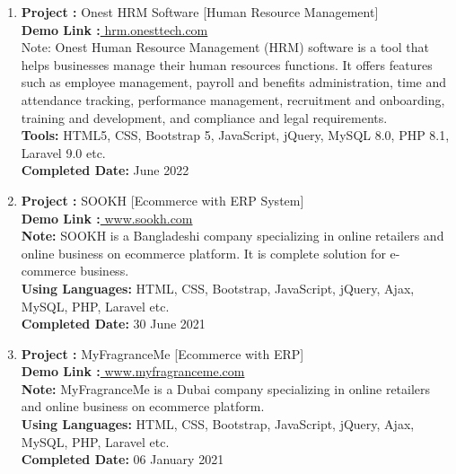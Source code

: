 \documentclass[10pt]{res}
\begin{document}
\begin{resume}
\begin{enumerate}
  \item \textbf{Project :} Onest HRM Software [Human Resource Management]\\
 \textbf{Demo Link :}\href{https://hrm.onesttech.com/}{ hrm.onesttech.com}\\ 
 \small{Note: Onest Human Resource Management (HRM) software is a tool that helps businesses manage their human resources functions. It offers features such as employee management, payroll and benefits administration, time and attendance tracking, performance management, recruitment and onboarding, training and development, and compliance and legal requirements.} \\
 \textbf{Tools:} HTML5, CSS, Bootstrap 5, JavaScript, jQuery, MySQL 8.0, PHP 8.1, Laravel 9.0 etc.\\
\textbf{Completed Date: } June 2022
\vspace{12pt}  



 \item \textbf{Project :} SOOKH [Ecommerce with ERP System]\\
 \textbf{Demo Link :}\href{https://sookh.com}{ www.sookh.com}\\ 
 \textbf{Note:} 
 \small{SOOKH is a Bangladeshi company specializing in online retailers and  online business on ecommerce platform. It is complete solution for e-commerce business.} \\
 \textbf{Using Languages:} HTML, CSS, Bootstrap, JavaScript, jQuery, Ajax, MySQL, PHP, Laravel etc.\\
\textbf{Completed Date: } 30 June 2021
\vspace{12pt}  


 \item \textbf{Project :} MyFragranceMe [Ecommerce with ERP]\\
 \textbf{Demo Link :}\href{http://demo.ahpretailoperation.com/testing/new/login}{ www.myfragranceme.com}\\ 
 \textbf{Note:} MyFragranceMe is a Dubai company specializing in online retailers and  online business on ecommerce platform. \\
 \textbf{Using Languages:} HTML, CSS, Bootstrap, JavaScript, jQuery, Ajax, MySQL, PHP, Laravel etc.\\
\textbf{Completed Date: } 06 January 2021
\vspace{12pt}  





\end{enumerate}
\end{resume}
\end{document}
